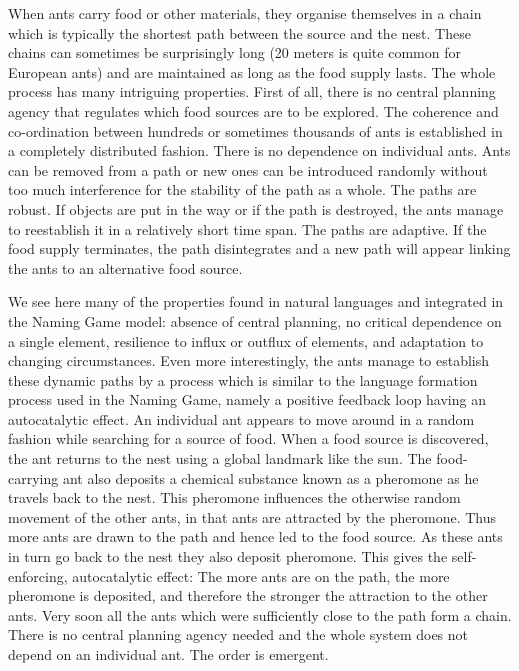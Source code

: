 When ants carry food or other materials, they organise themselves in a
chain which is typically the shortest path between the source and the nest. 
These chains can sometimes be surprisingly long (20 meters is 
quite common for European ants) and are 
maintained as long as the food supply lasts. The whole process has many
intriguing properties. First of all, there is
no central planning agency that regulates which food sources 
are to be explored. The coherence and co-ordination between hundreds
or sometimes thousands of ants is established in a 
completely distributed fashion. There is no dependence 
on individual ants. Ants can 
be removed from a path or new ones can be introduced randomly without too 
much interference for the stability of the path as a whole. The paths are
robust. If objects are put in the way or if the path is destroyed, 
the ants manage to reestablish it in a relatively short time span. 
The paths are adaptive. If the food supply terminates, the path 
disintegrates and a new path will appear linking the ants to an alternative 
food source. 

We see here many of the properties found in natural languages
and integrated in the Naming Game model: 
absence of central planning, no critical dependence on a 
single element, resilience to influx or outflux of elements, and
adaptation to changing circumstances. Even more interestingly, 
the ants manage to establish these dynamic paths by a process 
which is similar to the language formation process used in the 
Naming Game, namely a positive feedback loop having an autocatalytic
effect. An individual ant appears to move around in a random fashion 
while searching for a source of 
food. When a food source is discovered, the ant returns to the nest 
using a global landmark like the sun. 
The food-carrying ant also deposits a chemical substance 
known as a pheromone as he travels back to 
the nest. This pheromone influences the 
otherwise random movement of the other ants, in that ants are 
attracted by the pheromone. Thus more ants are drawn to the path and hence
led to the food source. As these ants in turn go back
to the nest they also deposit 
pheromone. This gives the self-enforcing, autocatalytic
effect: The more ants are on the path, 
the more pheromone is deposited, and therefore the stronger 
the attraction to the other ants.
Very soon all the ants which were sufficiently close 
to the path form a chain. There is no central planning agency 
needed and the whole system does not depend on an individual ant. The 
order is emergent. 

